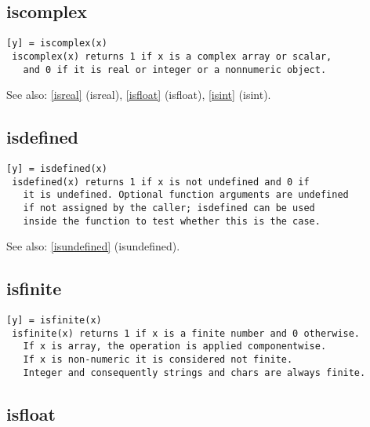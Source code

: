 \documentclass[a4paper]{article}
\begin{document}
\subsection{iscomplex\label{iscomplex}}

\begin{tscreen}
\begin{verbatim}
[y] = iscomplex(x)
 iscomplex(x) returns 1 if x is a complex array or scalar,
   and 0 if it is real or integer or a nonnumeric object.
\end{verbatim}

See also: \ref{isreal} {(isreal)}, \ref{isfloat} {(isfloat)}, \ref{isint} {(isint)}.
\end{tscreen}



\subsection{isdefined\label{isdefined}}

\begin{tscreen}
\begin{verbatim}
[y] = isdefined(x)
 isdefined(x) returns 1 if x is not undefined and 0 if
   it is undefined. Optional function arguments are undefined
   if not assigned by the caller; isdefined can be used
   inside the function to test whether this is the case.
\end{verbatim}

See also: \ref{isundefined} {(isundefined)}.
\end{tscreen}



\subsection{isfinite\label{isfinite}}

\begin{tscreen}
\begin{verbatim}
[y] = isfinite(x)
 isfinite(x) returns 1 if x is a finite number and 0 otherwise.
   If x is array, the operation is applied componentwise.
   If x is non-numeric it is considered not finite.
   Integer and consequently strings and chars are always finite. 
\end{verbatim}
\end{tscreen}



\subsection{isfloat\label{isfloat}}
\end{document}
